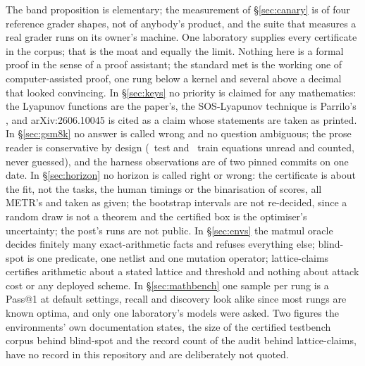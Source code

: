 \documentclass[11pt]{article}
\theoremstyle{definition}
\begin{document}
The band proposition is elementary; the measurement of \S\ref{sec:canary} is of four reference grader shapes, not of anybody's product, and the suite that measures a real grader runs on its owner's machine. One laboratory supplies every certificate in the corpus; that is the moat and equally the limit. Nothing here is a formal proof in the sense of a proof assistant; the standard met is the working one of computer-assisted proof, one rung below a kernel and several above a decimal that looked convincing. In \S\ref{sec:keys} no priority is claimed for any mathematics: the Lyapunov functions are the paper's, the SOS-Lyapunov technique is Parrilo's \cite{Parrilo00}, and arXiv:2606.10045 is cited as a claim whose statements are taken as printed. In \S\ref{sec:gsm8k} no answer is called wrong and no question ambiguous; the prose reader is conservative by design (\TestProseUnread\ test and \TrainProseUnread\ train equations unread and counted, never guessed), and the harness observations are of two pinned commits on one date. In \S\ref{sec:horizon} no horizon is called right or wrong: the certificate is about the fit, not the tasks, the human timings or the binarisation of scores, all METR's and taken as given; the bootstrap intervals are not re-decided, since a random draw is not a theorem and the certified box is the optimiser's uncertainty; the post's runs are not public. In \S\ref{sec:envs} the matmul oracle decides finitely many exact-arithmetic facts and refuses everything else; blind-spot is one predicate, one netlist and one mutation operator; lattice-claims certifies arithmetic about a stated lattice and threshold and nothing about attack cost or any deployed scheme. In \S\ref{sec:mathbench} one sample per rung is a Pass@1 at default settings, recall and discovery look alike since most rungs are known optima, and only one laboratory's models were asked. Two figures the environments' own documentation states, the size of the certified testbench corpus behind blind-spot and the record count of the audit behind lattice-claims, have no record in this repository and are deliberately not quoted.
\end{document}
